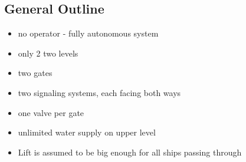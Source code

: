 \subsection{General Outline}
\begin{itemize}
	\item no operator - fully autonomous system
	\item only 2 two levels
	\item two gates
	\item two signaling systems, each facing both ways
	\item one valve per gate
	\item unlimited water supply on upper level
	\item Lift is assumed to be big enough for all ships passing through
\end{itemize}
\pagebreak


%
%
